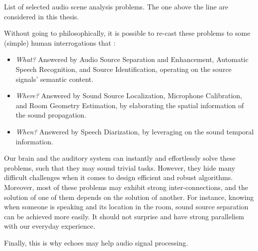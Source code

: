 \begin{table}[!h]

    \begin{fullwidth}
    \centering
    \small

    
    \caption{List of selected audio scene analysis problems. The one above the line are considered in this thesis.}
    \label{tab:processing:problems}

    \end{fullwidth}

\end{table}

\mynewline
Without going to philosophically, it is possible to re-cast these problems to some (simple) human interrogations that :
\begin{itemize}
    \item  \textit{What?} Answered by Audio Source Separation and Enhancement, Automatic Speech Recognition, and Source Identification, operating on the source signals' semantic content.
    \item  \textit{Where?} Answered by Sound Source Localization, Microphone Calibration, and Room Geometry Estimation, by elaborating the spatial information of the sound propagation.
    \item  \textit{When?} Answered by Speech Diarization, by leveraging on the sound temporal information.
\end{itemize}

\mynewline{}
Our brain and the auditory system can instantly and effortlessly solve these problems, such that they may sound trivial tasks.
However, they hide many difficult challenges when it comes to design efficient and robust algorithms.
Moreover, most of these problems may exhibit strong inter-connections, and the solution of one of them depends on the solution of another.
For instance, knowing when someone is speaking and its location in the room, sound source separation can be achieved more easily.
It should not surprise and have strong parallelism with our everyday experience.

\mynewline
Finally, this is why echoes may help audio signal processing.


